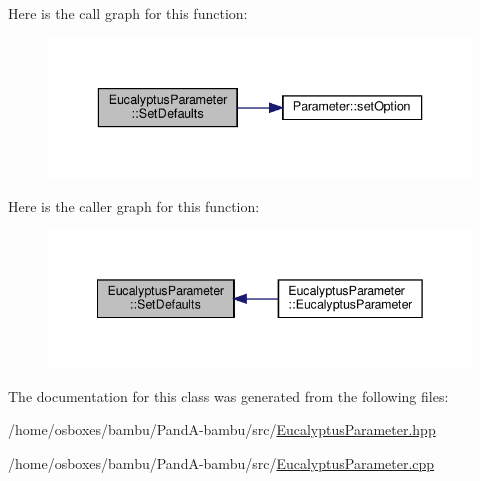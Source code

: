 Here is the call graph for this function\+:
\nopagebreak
\begin{figure}[H]
\begin{center}
\leavevmode
\includegraphics[width=336pt]{d0/d5b/classEucalyptusParameter_a6a12b064281764f529619b34b732a68d_cgraph}
\end{center}
\end{figure}
Here is the caller graph for this function\+:
\nopagebreak
\begin{figure}[H]
\begin{center}
\leavevmode
\includegraphics[width=342pt]{d0/d5b/classEucalyptusParameter_a6a12b064281764f529619b34b732a68d_icgraph}
\end{center}
\end{figure}


The documentation for this class was generated from the following files\+:\begin{DoxyCompactItemize}
\item 
/home/osboxes/bambu/\+Pand\+A-\/bambu/src/\hyperlink{EucalyptusParameter_8hpp}{Eucalyptus\+Parameter.\+hpp}\item 
/home/osboxes/bambu/\+Pand\+A-\/bambu/src/\hyperlink{EucalyptusParameter_8cpp}{Eucalyptus\+Parameter.\+cpp}\end{DoxyCompactItemize}
